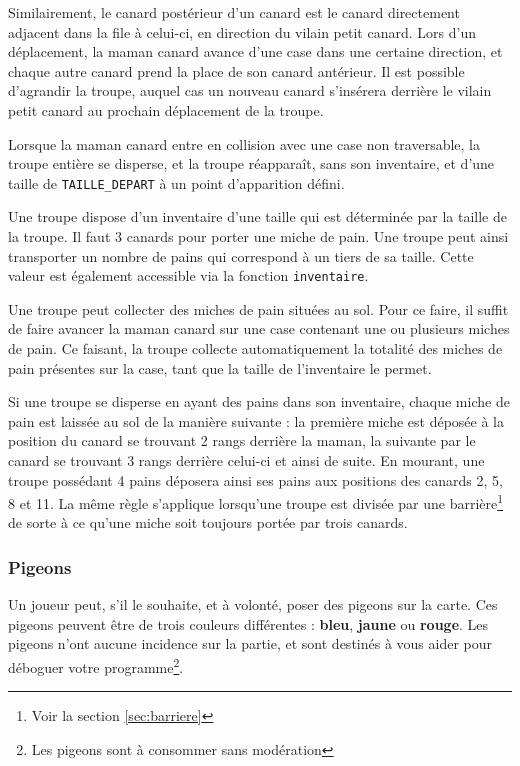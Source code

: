 Similairement, le \og canard postérieur\fg{} d'un canard est le canard directement
adjacent dans la file à celui-ci, en direction du vilain petit canard.
Lors d'un déplacement, la maman canard avance d'une case dans une certaine
direction, et chaque autre canard prend la place de son canard antérieur.
Il est possible d'agrandir la troupe, auquel cas un nouveau canard
s'insérera derrière le vilain petit canard au prochain déplacement de la troupe.

Lorsque la maman canard entre en collision avec une case non traversable,
la troupe entière se disperse, et la troupe réapparaît, sans son inventaire,
et d'une taille de \texttt{TAILLE\_DEPART} à un point d'apparition
défini.

Une troupe dispose d'un inventaire d'une taille qui est déterminée par la taille
de la troupe. Il faut 3 canards pour porter une miche de pain. Une troupe peut ainsi
transporter un nombre de pains qui correspond à un tiers de sa taille. Cette valeur
est également accessible via la fonction \texttt{inventaire}.

Une troupe peut collecter des miches de pain situées au sol.
Pour ce faire, il suffit de faire avancer la maman canard sur une case contenant une
ou plusieurs miches de pain.
Ce faisant, la troupe collecte automatiquement la totalité des miches de pain
présentes sur la case, tant que la taille de l'inventaire le permet.

Si une troupe se disperse en ayant des pains dans son inventaire, chaque miche de pain
est laissée au sol de la manière suivante : la première miche est déposée à la position
du canard se trouvant 2 rangs derrière la maman, la suivante par le canard se trouvant 3
rangs derrière celui-ci et ainsi de suite. En mourant, une troupe possédant 4 pains déposera
ainsi ses pains aux positions des canards 2, 5, 8 et 11. La même règle s'applique
lorsqu'une troupe est divisée par une barrière\footnote{Voir la section \ref{sec:barriere}} de sorte à ce qu'une miche soit toujours
portée par trois canards.

\subsubsection{Pigeons}

Un joueur peut, s'il le souhaite, et à volonté, poser des pigeons sur la carte.
Ces pigeons peuvent être de trois couleurs différentes : \textbf{bleu}, \textbf{jaune} ou \textbf{rouge}.
Les pigeons n'ont aucune incidence sur la partie, et sont destinés à vous aider
pour déboguer votre programme\footnote{Les pigeons sont à consommer sans modération}.

